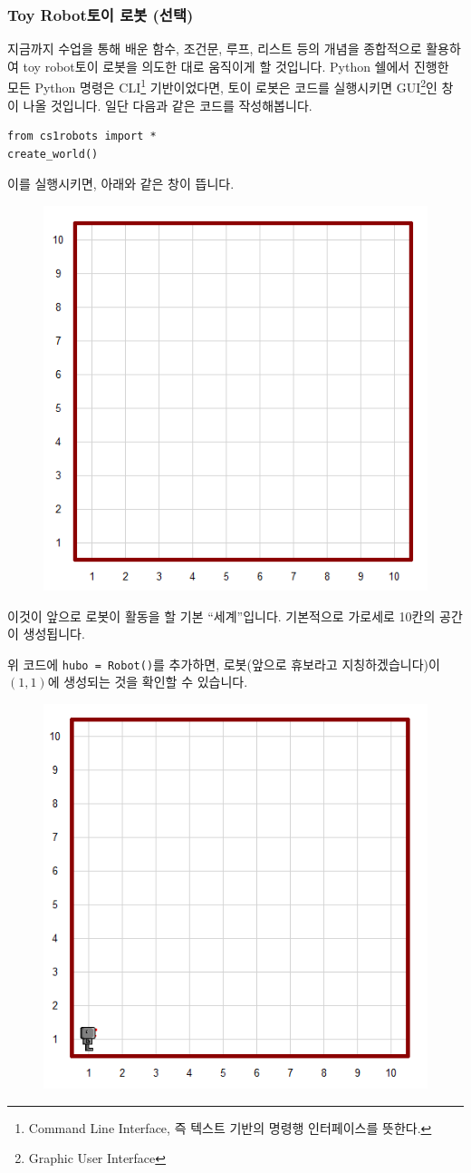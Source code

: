 \documentclass[../main.tex]{subfiles}
\begin{document}
\subsubsection{Toy Robot토이 로봇 (선택)}
지금까지 수업을 통해 배운 함수, 조건문, 루프, 리스트 등의 개념을 종합적으로 활용하여 toy robot토이 로봇을 의도한 대로 움직이게 할 것입니다.
Python 쉘에서 진행한 모든 Python 명령은 CLI\footnote{Command Line Interface, 즉 텍스트 기반의 명령행 인터페이스를 뜻한다.} 기반이었다면, 토이 로봇은 코드를 실행시키면 GUI\footnote{Graphic User Interface}인 창이 나올 것입니다.
일단 다음과 같은 코드를 작성해봅니다.
\begin{verbatim}
from cs1robots import *
create_world()
\end{verbatim}
이를 실행시키면, 아래와 같은 창이 뜹니다.
\begin{figure}[H]
\centering
\includegraphics[width=0.5\linewidth]{"./lectures/lecture4_emptyworld"}
\label{fig:lecture4emptyworld}
\end{figure}
이것이 앞으로 로봇이 활동을 할 기본 ``세계''입니다.
기본적으로 가로세로 10칸의 공간이 생성됩니다.

위 코드에 \texttt{hubo = Robot()}를 추가하면, 로봇(앞으로 휴보라고 지칭하겠습니다)이 $(1, 1)$에 생성되는 것을 확인할 수 있습니다.
\begin{figure}[H]
\centering
\includegraphics[width=0.5\linewidth]{"./lectures/lecture4_hubo"}
\label{fig:lecture4hubo}
\end{figure}
\end{document}
